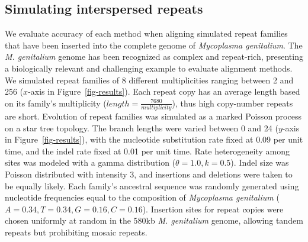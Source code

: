 \documentclass{llncs}
\begin{document}
\subsection{Simulating interspersed repeats}
We evaluate accuracy of each method when aligning simulated repeat
families that have been inserted into the complete genome of
\emph{Mycoplasma genitalium}. The \emph{M. genitalium} genome has been recognized
as complex and repeat-rich\cite{ref-mycoplasma}, presenting a biologically
relevant and challenging example to evaluate alignment
methods. We simulated repeat families of 8
different multiplicities ranging between 2 and 256 ($x$-axis in
Figure~\ref{fig-results}).  Each repeat copy has an average length
based on its family's multiplicity
($length=\frac{7680}{multiplicity}$), thus high copy-number repeats
are short.  Evolution of repeat families was simulated as a marked
Poisson process on a star tree
topology.  The branch lengths were varied between 0 and 24 ($y$-axis
in Figure~\ref{fig-results}), with the nucleotide substitution rate
fixed at 0.09 per unit time, and the indel rate fixed at 0.01 per
unit time.  Rate heterogeneity among sites was modeled with a gamma
distribution ($\theta = 1.0, k = 0.5$).  Indel size was
Poisson distributed with intensity 3, and insertions and deletions
were taken to be equally likely.  Each family's ancestral
sequence was randomly generated using nucleotide frequencies equal to
the composition of \emph{Mycoplasma genitalium}
($A=0.34,T=0.34,G=0.16,C=0.16$). Insertion sites for repeat copies
were chosen uniformly at random in the 580kb \textit{M. genitalium} genome,
allowing tandem repeats but prohibiting mosaic repeats.
\end{document}
